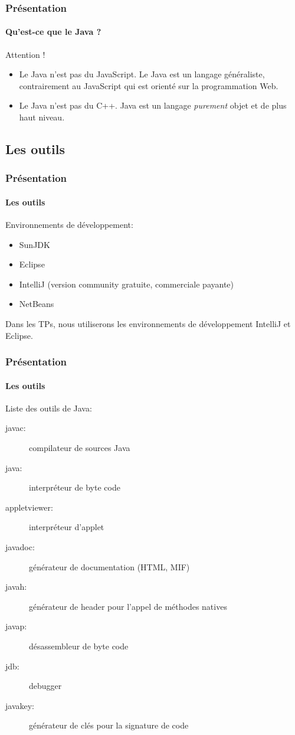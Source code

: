 		\begin{frame}
			\frametitle{Présentation}
			\framesubtitle{Qu'est-ce que le Java ?}
			\begin{alertblock}{Attention !}
				\begin{itemize}
					\item <1-> Le Java n'est pas du JavaScript. Le Java est un langage \og généraliste\fg{}, contrairement au JavaScript qui est orienté sur la programmation Web.
					\item <2-> Le Java n'est pas du C++. Java est un langage \emph{purement} objet et de plus haut niveau.
				\end{itemize}
			\end{alertblock}
		\end{frame}	
	
	\subsection{Les outils}
	
		\begin{frame}
			\frametitle{Présentation}
			\framesubtitle{Les outils}
			Environnements de développement:
			\begin{itemize}
				\item SunJDK
				\item Eclipse
				\item IntelliJ (version \og community\fg{} gratuite, commerciale payante)
				\item NetBeans
			\end{itemize}
			\pause
			\begin{remarque}
				Dans les TPs, nous utiliserons les environnements de développement IntelliJ et Eclipse.
			\end{remarque}
		\end{frame}	
	
		\begin{frame}
			\frametitle{Présentation}
			\framesubtitle{Les outils}
			Liste des outils de Java:
			\begin{description}
				\item[javac:] compilateur de sources Java
				\item[java:] interpréteur de byte code
				\item[appletviewer:] interpréteur d'applet
				\item[javadoc:] générateur de documentation (HTML, MIF)
				\item[javah:] générateur de header pour l'appel de méthodes natives
				\item[javap:] désassembleur de byte code
				\item[jdb:] debugger
				\item[javakey:] générateur de clés pour la signature de code
			\end{description}
		\end{frame}	
	

